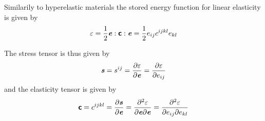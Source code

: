 Similarily to hyperelastic materials the stored energy function for linear
elasticity is given by
\begin{equation}
  \varepsilon=\frac{1}{2} \boldsymbol{\mathit{e}} : \boldsymbol{\mathsf{c}} : \boldsymbol{\mathit{e}} =\frac{1}{2}e_{ij}c^{ijkl}e_{kl}
\end{equation}

The stress tensor is thus given by
\begin{equation}
  \boldsymbol{\mathit{s}}=s^{ij}= \dfrac{\partial \varepsilon}{\partial \boldsymbol{\mathit{e}}} = \dfrac{\partial \varepsilon}{\partial e_{ij}} 
\end{equation}
and the elasticity tensor is given by
\begin{equation}
  \boldsymbol{\mathsf{c}}=c^{ijkl}= \dfrac{\partial \boldsymbol{\mathit{s}}}{\partial \boldsymbol{\mathit{e}}} = \dfrac{\partial^{2} \varepsilon}{\partial \boldsymbol{\mathit{e}} \partial \boldsymbol{\mathit{e}}} = \dfrac{\partial^{2} \varepsilon}{\partial e_{ij} \partial e_{kl}} 
\end{equation}
